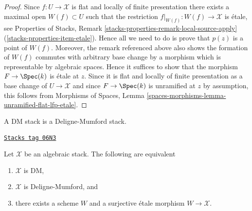 \begin{proof}
Since $f : U \to \mathcal{X}$ is flat and locally of finite presentation
there exists a maximal open $W(f) \subset U$ such that the restriction
$f|_{W(f)} : W(f) \to \mathcal{X}$ is \'etale, see
Properties of Stacks, Remark
\ref{stacks-properties-remark-local-source-apply}
(\ref{stacks-properties-item-etale}).
Hence all we need to do is prove that $p(z)$ is a point of $W(f)$.
Moreover, the remark referenced above also shows the formation of $W(f)$
commutes with arbitrary base change by a morphism which is representable
by algebraic spaces. Hence it suffices to show that the morphism
$F \to \Spec(k)$ is \'etale at $z$. Since it is flat and locally
of finite presentation as a base change of $U \to \mathcal{X}$ and since
$F \to \Spec(k)$ is unramified at $z$ by assumption, this follows
from
Morphisms of Spaces,
Lemma \ref{spaces-morphisms-lemma-unramified-flat-lfp-etale}.
\end{proof}

A DM stack is a Deligne-Mumford stack.

\begin{theorem}[DM]
\label{stacks-morphisms-theorem-DM}
\href{https://stacks.math.columbia.edu/tag/06N3}{\texttt{Stacks tag 06N3}}

Let $\mathcal{X}$ be an algebraic stack. The following are equivalent
\begin{enumerate}
\item $\mathcal{X}$ is DM,
\item $\mathcal{X}$ is Deligne-Mumford, and
\item there exists a scheme $W$ and a surjective \'etale
morphism $W \to \mathcal{X}$.
\end{enumerate}
\end{theorem}

